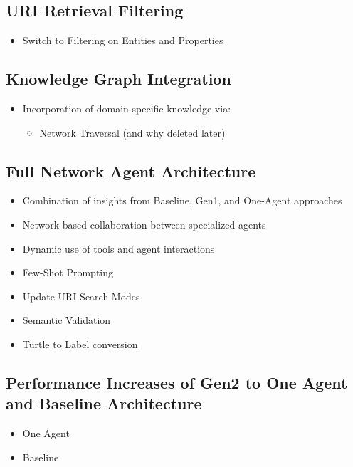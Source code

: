 \documentclass[a4paper,oneside,bibliography=totoc]{scrbook}
\begin{document}
\subsection{URI Retrieval Filtering}
\label{subsec:uri_retrieval_filtering}
\begin{itemize}
  \item Switch to Filtering on Entities and Properties
\end{itemize}

\subsection{Knowledge Graph Integration}
\label{subsec:knowledge_graph_integration}
\begin{itemize}
  \item Incorporation of domain-specific knowledge via:
        \begin{itemize}
          \item Network Traversal (and why deleted later)

        \end{itemize}
\end{itemize}

\subsection{Full Network Agent Architecture}
\label{subsec:full_network_agent_architecture}
\begin{itemize}
  \item Combination of insights from Baseline, Gen1, and One-Agent approaches
  \item Network-based collaboration between specialized agents
  \item Dynamic use of tools and agent interactions
  \item Few-Shot Prompting
  \item Update URI Search Modes
  \item Semantic Validation
  \item Turtle to Label conversion
\end{itemize}

\subsection{Performance Increases of Gen2 to One Agent and Baseline Architecture}
\label{subsec:performance_increases_gen2}
\begin{itemize}
  \item One Agent
  \item Baseline
\end{itemize}
\end{document}
